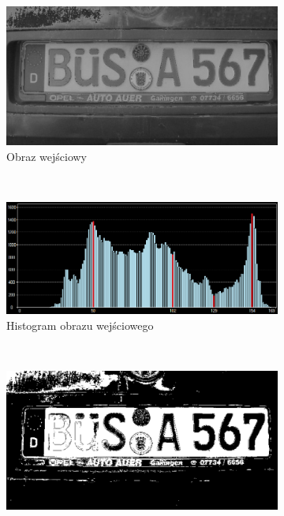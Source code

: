 \begin{figure}
  \centering
  \begin{subfigure}[b]{0.7\textwidth}
    \includegraphics[width=\textwidth]{img/histogram-valleys-input}
    \caption{Obraz wejściowy}
    \label{fig:histogram_valleys_input}
  \end{subfigure}
  ~
  \begin{subfigure}[b]{0.7\textwidth}
    \includegraphics[width=\textwidth]{img/histogram-valleys-histogram}
    \caption{Histogram obrazu wejściowego}
    \label{fig:histogram_valleys_histogram}
  \end{subfigure}
  ~
  \begin{subfigure}[b]{0.45\textwidth}
    \includegraphics[width=\textwidth]{img/histogram-valleys-bad}

\end{subfigure}
\end{figure}
